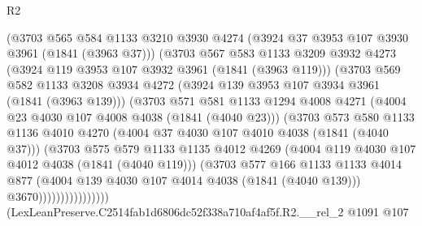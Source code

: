 \begin{lexlean}{R2}
\begin{coremodule}
                        (@3703
                          @565
                          @584
                          @1133
                          @3210
                          @3930
                          @4274
                          (@3924 @37 @3953 @107 @3930 @3961 (@1841 (@3963 @37)))
                          (@3703
                            @567
                            @583
                            @1133
                            @3209
                            @3932
                            @4273
                            (@3924 @119 @3953 @107 @3932 @3961 (@1841 (@3963 @119)))
                            (@3703
                              @569
                              @582
                              @1133
                              @3208
                              @3934
                              @4272
                              (@3924 @139 @3953 @107 @3934 @3961 (@1841 (@3963 @139)))
                              (@3703
                                @571
                                @581
                                @1133
                                @1294
                                @4008
                                @4271
                                (@4004 @23 @4030 @107 @4008 @4038 (@1841 (@4040 @23)))
                                (@3703
                                  @573
                                  @580
                                  @1133
                                  @1136
                                  @4010
                                  @4270
                                  (@4004 @37 @4030 @107 @4010 @4038 (@1841 (@4040 @37)))
                                  (@3703
                                    @575
                                    @579
                                    @1133
                                    @1135
                                    @4012
                                    @4269
                                    (@4004 @119 @4030 @107 @4012 @4038 (@1841 (@4040 @119)))
                                    (@3703
                                      @577
                                      @166
                                      @1133
                                      @1133
                                      @4014
                                      @877
                                      (@4004 @139 @4030 @107 @4014 @4038 (@1841 (@4040 @139)))
                                      @3670))))))))))))))))
      (LexLeanPreserve.C2514fab1d6806dc52f338a710af4af5f.R2.__rel_2
        @1091
        @107

\end{coremodule}
\end{lexlean}
